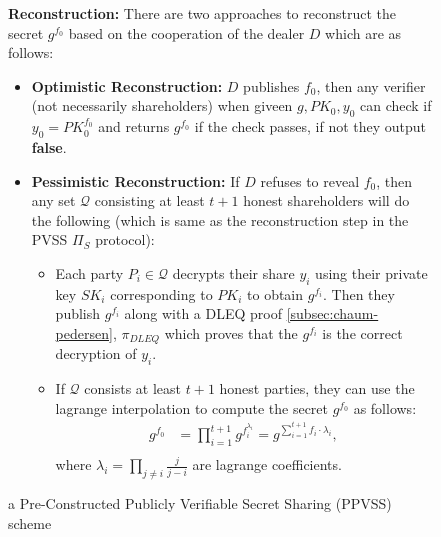 \begin{figure}[ht]
{\begin{tcolorbox}[title=\textbf{$\Lambda_{RO}$ \cite{cryptoeprint:2025/576}}, width=1.2\textwidth, colframe=blue!75!black, colback=blue!10, sharp corners]
        \vspace{0.5em}
        \textbf{Reconstruction:}
            There are two approaches to reconstruct the secret $g^{f_0}$ based on the 
            cooperation of the dealer $D$ which are as follows:
            \begin{itemize}
                \item \textbf{Optimistic Reconstruction:} $D$ publishes $f_0$, then any verifier (not necessarily shareholders) 
                when giveen $g,PK_0,y_0$ can check if $y_0=PK_0^{f_0}$ and returns $g^{f_0}$ 
                if the check passes, if not they output \textbf{false}.
                \item \textbf{Pessimistic Reconstruction:} If $D$ refuses to reveal $f_0$, then any set 
                $\mathcal{Q}$ consisting at least $t+1$ honest shareholders will do the following (which 
                is same as the reconstruction step in the PVSS $\Pi_S$ protocol):
                \begin{itemize}
                    \item Each party $P_i\in\mathcal{Q}$ decrypts their share $y_i$ using their private key $SK_i$ 
                      corresponding to $PK_i$ to obtain $g^{f_i}$. Then they publish $g^{f_i}$ 
                      along with a DLEQ proof \ref{subsec:chaum-pedersen}, $\pi_{DLEQ}$ which proves that the 
                       $g^{f_i}$ is the correct decryption of $y_i$.
                    \item If $\mathcal{Q}$ consists at least $t+1$ honest parties, they can use the 
                    lagrange interpolation to compute the secret $g^{f_0}$ as follows:
                    \begin{align*}
                        g^{f_0} &= \prod_{i=1}^{t+1} g^{f_i^{\lambda_i}} = g^{\sum_{i=1}^{t+1}f_i\cdot\lambda_i},\\
                    \end{align*}
                    where $\lambda_i=\prod_{j\neq i}\frac{j}{j-i}$ are lagrange coefficients.
                \end{itemize}
            \end{itemize}
    \end{tcolorbox}
    }
    \caption[PPVSS Scheme]{a Pre-Constructed Publicly Verifiable Secret Sharing (PPVSS) scheme}
    \label{fig:ppvss}
\end{figure}